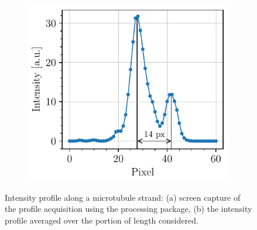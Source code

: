 \begin{figure}[htbp]
    \begin{subfigure}[b]{0.49\textwidth}    %
        \centering
        \caption{}
        \label{fig:microtubules_width_acquisition}
    \end{subfigure}
    \begin{subfigure}[b]{0.49\textwidth}
        \centering
        \includegraphics[scale=1]{figures/microtubules_width.pdf}
        \caption{}
        \label{fig:microtubules_width_analysis}
    \end{subfigure}
    \caption{Intensity profile along a microtubule strand: (a) screen capture of the profile acquisition using the  processing package, (b) the intensity profile averaged over the portion of length considered.}
    \label{fig:microtubules_width}
\end{figure}


